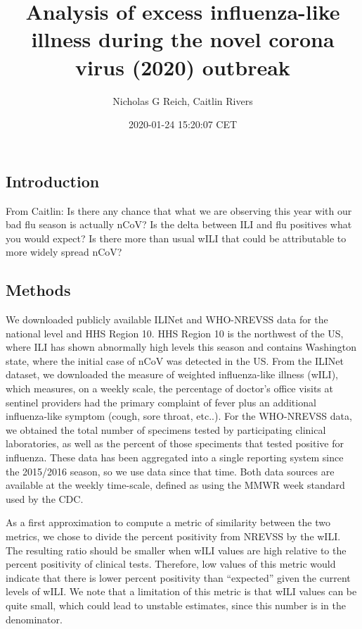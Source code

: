 \documentclass[]{article}
\title{Analysis of excess influenza-like illness during the novel corona virus
(2020) outbreak}
\author{Nicholas G Reich, Caitlin Rivers}
\date{2020-01-24 15:20:07 CET}
\begin{document}
\maketitle

\hypertarget{introduction}{%
\subsection{Introduction}\label{introduction}}

From Caitlin: Is there any chance that what we are observing this year
with our bad flu season is actually nCoV? Is the delta between ILI and
flu positives what you would expect? Is there more than usual wILI that
could be attributable to more widely spread nCoV?

\hypertarget{methods}{%
\subsection{Methods}\label{methods}}

We downloaded publicly available ILINet and WHO-NREVSS data for the
national level and HHS Region 10. HHS Region 10 is the northwest of the
US, where ILI has shown abnormally high levels this season and contains
Washington state, where the initial case of nCoV was detected in the US.
From the ILINet dataset, we downloaded the measure of weighted
influenza-like illness (wILI), which measures, on a weekly scale, the
percentage of doctor's office visits at sentinel providers had the
primary complaint of fever plus an additional influenza-like symptom
(cough, sore throat, etc..). For the WHO-NREVSS data, we obtained the
total number of specimens tested by participating clinical laboratories,
as well as the percent of those speciments that tested positive for
influenza. These data has been aggregated into a single reporting system
since the 2015/2016 season, so we use data since that time. Both data
sources are available at the weekly time-scale, defined as using the
MMWR week standard used by the CDC.

As a first approximation to compute a metric of similarity between the
two metrics, we chose to divide the percent positivity from NREVSS by
the wILI. The resulting ratio should be smaller when wILI values are
high relative to the percent positivity of clinical tests. Therefore,
low values of this metric would indicate that there is lower percent
positivity than ``expected'' given the current levels of wILI. We note
that a limitation of this metric is that wILI values can be quite small,
which could lead to unstable estimates, since this number is in the
denominator.
\end{document}
